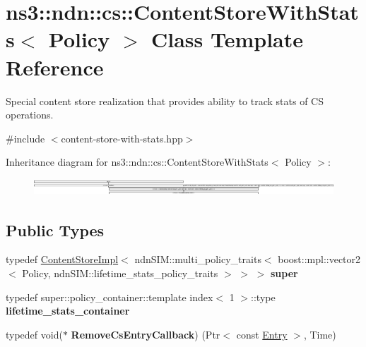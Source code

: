 \hypertarget{classns3_1_1ndn_1_1cs_1_1ContentStoreWithStats}{}\section{ns3\+:\+:ndn\+:\+:cs\+:\+:Content\+Store\+With\+Stats$<$ Policy $>$ Class Template Reference}
\label{classns3_1_1ndn_1_1cs_1_1ContentStoreWithStats}


Special content store realization that provides ability to track stats of CS operations.  




{\ttfamily \#include $<$content-\/store-\/with-\/stats.\+hpp$>$}

Inheritance diagram for ns3\+:\+:ndn\+:\+:cs\+:\+:Content\+Store\+With\+Stats$<$ Policy $>$\+:\begin{figure}[H]
\begin{center}
\leavevmode
\includegraphics[height=0.627451cm]{classns3_1_1ndn_1_1cs_1_1ContentStoreWithStats}
\end{center}
\end{figure}
\subsection*{Public Types}
\begin{DoxyCompactItemize}
\item 
typedef \hyperlink{classns3_1_1ndn_1_1cs_1_1ContentStoreImpl}{Content\+Store\+Impl}$<$ ndn\+S\+I\+M\+::multi\+\_\+policy\+\_\+traits$<$ boost\+::mpl\+::vector2$<$ Policy, ndn\+S\+I\+M\+::lifetime\+\_\+stats\+\_\+policy\+\_\+traits $>$ $>$ $>$ {\bfseries super}\hypertarget{classns3_1_1ndn_1_1cs_1_1ContentStoreWithStats_ab5bed8592146bbdddc7fe854e943bf51}{}\label{classns3_1_1ndn_1_1cs_1_1ContentStoreWithStats_ab5bed8592146bbdddc7fe854e943bf51}

\item 
typedef super\+::policy\+\_\+container\+::template index$<$ 1 $>$\+::type {\bfseries lifetime\+\_\+stats\+\_\+container}\hypertarget{classns3_1_1ndn_1_1cs_1_1ContentStoreWithStats_a37f68ed1149b35564ce08627742462c5}{}\label{classns3_1_1ndn_1_1cs_1_1ContentStoreWithStats_a37f68ed1149b35564ce08627742462c5}

\item 
typedef void($\ast$ {\bfseries Remove\+Cs\+Entry\+Callback}) (Ptr$<$ const \hyperlink{classns3_1_1ndn_1_1cs_1_1Entry}{Entry} $>$, Time)\hypertarget{classns3_1_1ndn_1_1cs_1_1ContentStoreWithStats_a22ebf035a4392dce432ee75d610db651}{}\label{classns3_1_1ndn_1_1cs_1_1ContentStoreWithStats_a22ebf035a4392dce432ee75d610db651}

\end{DoxyCompactItemize}
